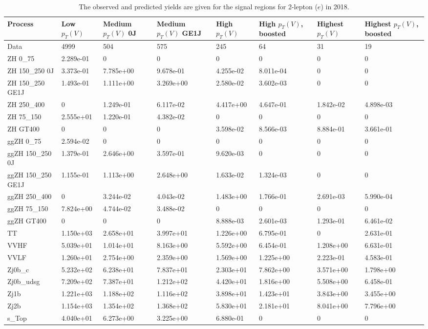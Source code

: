 \begin{table}
\centering
\caption[2018 2-lepton ($e$) signal selection yields]{
                  The observed and predicted yields are given for the
                  signal regions for 2-lepton ($e$) in 2018.
                  }
{\footnotesize
\begin{tabularx}{\textwidth}{|X|X|X|X|X|X|X|X|}
\hline
Process & Low $p_{T}(V)$ & Medium $p_{T}(V)$ 0J & Medium $p_{T}(V)$ GE1J & High $p_{T}(V)$ & High $p_{T}(V)$, boosted & Highest $p_{T}(V)$ & Highest $p_{T}(V)$, boosted \\
\hline
Data & 4999 & 504 & 575 & 245 & 64 & 31 & 19 \\
\hline
ZH 0\_75 & 2.289e-01 & 0 & 0 & 0 & 0 & 0 & 0 \\
ZH 150\_250 0J & 3.373e-01 & 7.785e+00 & 9.678e-01 & 4.255e-02 & 8.011e-04 & 0 & 0 \\
ZH 150\_250 GE1J & 1.493e-01 & 1.111e+00 & 3.269e+00 & 2.580e-02 & 3.602e-03 & 0 & 0 \\
ZH 250\_400 & 0 & 1.249e-01 & 6.117e-02 & 4.417e+00 & 4.647e-01 & 1.842e-02 & 4.898e-03 \\
ZH 75\_150 & 2.555e+01 & 1.220e-01 & 4.382e-02 & 0 & 0 & 0 & 0 \\
ZH GT400 & 0 & 0 & 0 & 3.598e-02 & 8.566e-03 & 8.884e-01 & 3.661e-01 \\
ggZH 0\_75 & 2.594e-02 & 0 & 0 & 0 & 0 & 0 & 0 \\
ggZH 150\_250 0J & 1.379e-01 & 2.646e+00 & 3.597e-01 & 9.620e-03 & 0 & 0 & 0 \\
ggZH 150\_250 GE1J & 1.155e-01 & 1.113e+00 & 2.648e+00 & 1.633e-02 & 1.324e-03 & 0 & 0 \\
ggZH 250\_400 & 0 & 3.244e-02 & 4.043e-02 & 1.483e+00 & 1.766e-01 & 2.691e-03 & 5.990e-04 \\
ggZH 75\_150 & 7.824e+00 & 4.744e-02 & 3.488e-02 & 0 & 0 & 0 & 0 \\
ggZH GT400 & 0 & 0 & 0 & 8.888e-03 & 2.601e-03 & 1.293e-01 & 6.461e-02 \\
\hline
TT & 1.150e+03 & 2.658e+01 & 3.997e+01 & 1.226e+00 & 6.795e-01 & 0 & 2.631e-01 \\
VVHF & 5.039e+01 & 1.014e+01 & 8.163e+00 & 5.592e+00 & 6.454e-01 & 1.208e+00 & 6.631e-01 \\
VVLF & 1.260e+01 & 2.754e+00 & 2.359e+00 & 1.569e+00 & 1.225e+00 & 2.223e-01 & 4.583e-01 \\
Zj0b\_c & 5.232e+02 & 6.238e+01 & 7.837e+01 & 2.303e+01 & 7.862e+00 & 3.571e+00 & 1.798e+00 \\
Zj0b\_udsg & 7.209e+02 & 7.387e+01 & 1.212e+02 & 4.420e+01 & 1.816e+00 & 5.508e+00 & 6.458e-01 \\
Zj1b & 1.221e+03 & 1.188e+02 & 1.116e+02 & 3.898e+01 & 1.423e+01 & 3.843e+00 & 3.455e+00 \\
Zj2b & 1.154e+03 & 1.354e+02 & 1.368e+02 & 5.830e+01 & 2.181e+01 & 8.041e+00 & 7.796e+00 \\
s\_Top & 4.040e+01 & 6.273e+00 & 3.225e+00 & 6.880e-01 & 0 & 0 & 0 \\
\hline
\end{tabularx}
}
\label{tab:sr-Zee-2018}
\end{table}

